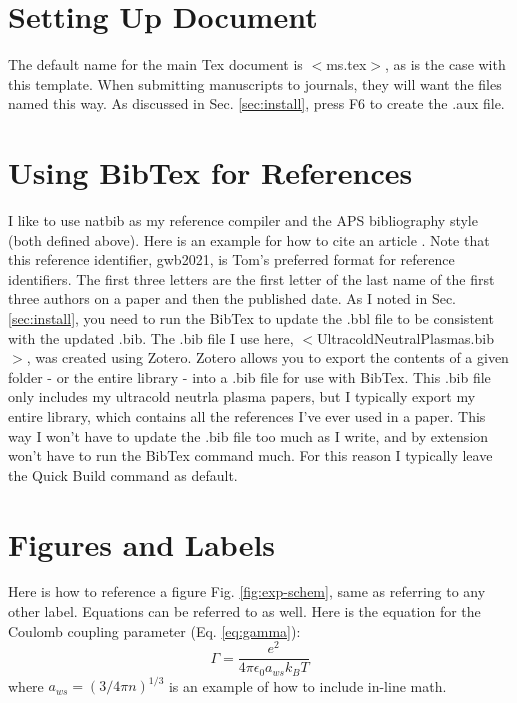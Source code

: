 \documentclass[11pt]{article}		%
\begin{document}
\section{Setting Up Document}
\label{sec:setup}
The default name for the main Tex document is $<$ms.tex$>$, as is the case with this template. When submitting manuscripts to journals, they will want the files named this way. As discussed in Sec. \ref{sec:install}, press F6 to create the .aux file.

\section{Using BibTex for References}
\label{sec:bib}

I like to use natbib as my reference compiler and the APS bibliography style (both defined above). Here is an example for how to cite an article \cite{gwb2021}. Note that this reference identifier, gwb2021, is Tom's preferred format for reference identifiers. The first three letters are the first letter of the last name of the first three authors on a paper and then the published date. As I noted in Sec. \ref{sec:install}, you need to run the BibTex to update the .bbl file to be consistent with the updated .bib. The .bib file I use here, $<$UltracoldNeutralPlasmas.bib$>$, was created using Zotero. Zotero allows you to export the contents of a given folder - or the entire library - into a .bib file for use with BibTex. This .bib file only includes my ultracold neutrla plasma papers, but I typically export my entire library, which contains all the references I've ever used in a paper. This way I won't have to update the .bib file too much as I write, and by extension won't have to run the BibTex command much. For this reason I typically leave the Quick Build command as default.

\section{Figures and Labels}
\label{sec:figs}

Here is how to reference a figure Fig. \ref{fig:exp-schem}, same as referring to any other label. Equations can be referred to as well. Here is the equation for the Coulomb coupling parameter (Eq. \ref{eq:gamma}):
\begin{equation}
\label{eq:gamma}
\Gamma=\frac{e^2}{4\pi\epsilon_0 a_{ws} k_B T}
\end{equation}
where $a_{ws}=(3/4\pi n)^{1/3}$ is an example of how to include in-line math.
\end{document}

